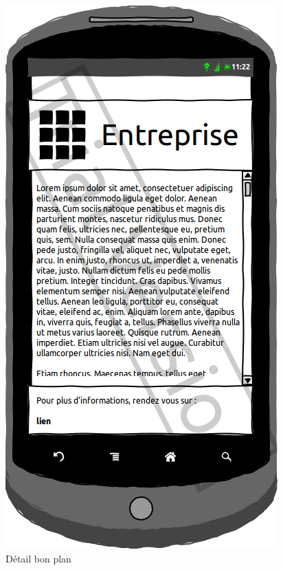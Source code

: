 \documentclass[a4paper, 11pt]{article}
\begin{document}
\begin{figure}[htbp]
\begin{minipage}[c]{.33\linewidth}
\begin{center}
			\includegraphics[scale=0.3]{../../Sketch/Android/DescrBP.png}
		\end{center}
	\caption{Détail bon plan}
	\end{minipage}
	\begin{minipage}[c]{.33\linewidth}
		\begin{center}

\end{center}
\end{minipage}
\end{figure}
\end{document}
